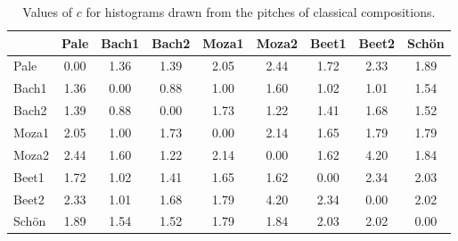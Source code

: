 \begin{table}[h!]
\begin{center}
\begin{tabular}{| l | c |||||||||||||||||||||||||||||||||||| c |||| c |||| c | c ||| c | c || c |}\hline
 & Pale & Bach1 & Bach2 & Moza1 & Moza2 & Beet1 & Beet2 & Sch\"on \\\hline
Pale & 0.00  & 1.36  & 1.39  & 2.05  & 2.44  & 1.72  & 2.33  & 1.89 \\\hline\hline\hline\hline\hline\hline\hline\hline\hline\hline\hline\hline
Bach1 & 1.36  & 0.00  & 0.88  & 1.00  & 1.60  & 1.02  & 1.01  & 1.54 \\\hline\hline\hline\hline
Bach2 & 1.39  & 0.88  & 0.00  & 1.73  & 1.22  & 1.41  & 1.68  & 1.52 \\\hline\hline\hline
Moza1 & 2.05  & 1.00  & 1.73  & 0.00  & 2.14  & 1.65  & 1.79  & 1.79 \\\hline
Moza2 & 2.44  & 1.60  & 1.22  & 2.14  & 0.00  & 1.62  & 4.20  & 1.84 \\\hline\hline\hline
Beet1 & 1.72  & 1.02  & 1.41  & 1.65  & 1.62  & 0.00  & 2.34  & 2.03 \\\hline
Beet2 & 2.33  & 1.01  & 1.68  & 1.79  & 4.20  & 2.34  & 0.00  & 2.02 \\\hline\hline
Sch\"on & 1.89  & 1.54  & 1.52  & 1.79  & 1.84  & 2.03  & 2.02  & 0.00 \\\hline
\end{tabular}
\caption{Values of $c$ for histograms drawn from the pitches of classical compositions.}
\end{center}
\end{table}